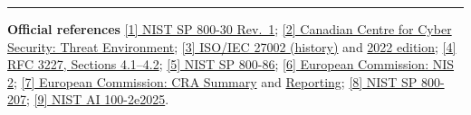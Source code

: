 \documentclass[11pt,a4paper]{article}
\begin{document}
\vspace{1pt}
\hrule
\vspace{3pt}
{\footnotesize
\textbf{Official references} \quad
\href{https://doi.org/10.6028/NIST.SP.800-30r1}{[1] NIST SP 800-30 Rev.~1};
\href{https://www.cyber.gc.ca/en/guidance/introduction-cyber-threat-environment}{[2] Canadian Centre for Cyber Security: Threat Environment};
\href{https://www.iso.org/standard/50297.html}{[3] ISO/IEC 27002 (history)}
and \href{https://www.iso.org/standard/75652.html}{2022 edition};
\href{https://www.rfc-editor.org/rfc/rfc3227.html}{[4] RFC 3227, Sections 4.1--4.2};
\href{https://doi.org/10.6028/NIST.SP.800-86}{[5] NIST SP 800-86};
\href{https://digital-strategy.ec.europa.eu/en/policies/nis2-directive}{[6] European Commission: NIS 2};
\href{https://digital-strategy.ec.europa.eu/en/policies/cra-summary}{[7] European Commission: CRA Summary}
and \href{https://digital-strategy.ec.europa.eu/en/policies/cra-reporting}{Reporting};
\href{https://doi.org/10.6028/NIST.SP.800-207}{[8] NIST SP 800-207};
\href{https://doi.org/10.6028/NIST.AI.100-2e2025}{[9] NIST AI 100-2e2025}.
}
\end{document}
